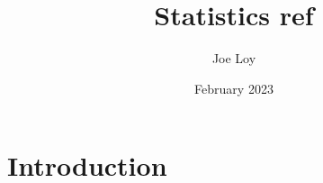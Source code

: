 \documentclass{article}
\title{Statistics ref}
\author{Joe Loy}
\date{February 2023}
\begin{document}
\maketitle

\section{Introduction}
\end{document}
